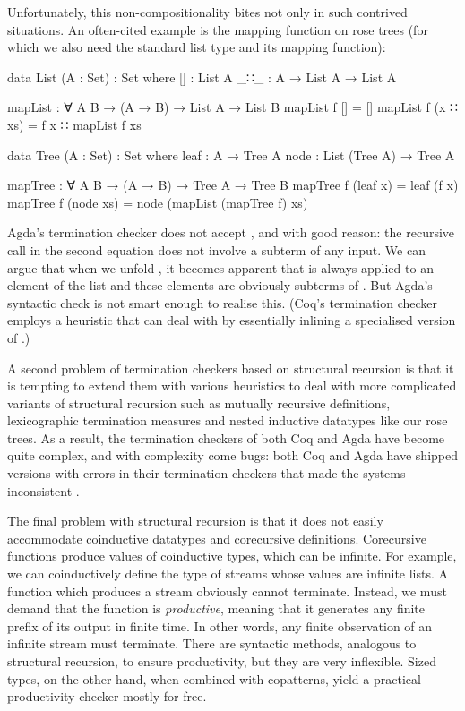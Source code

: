 Unfortunately, this non-compositionality bites not only in such contrived
situations. An often-cited example is the mapping function on rose trees (for
which we also need the standard list type and its mapping function):
\begin{code}
  data List (A : Set) : Set where
    []  : List A
    _∷_ : A → List A → List A

  mapList : ∀ {A B} → (A → B) → List A → List B
  mapList f []       = []
  mapList f (x ∷ xs) = f x ∷ mapList f xs

  data Tree (A : Set) : Set where
    leaf : A → Tree A
    node : List (Tree A) → Tree A

  mapTree : ∀ {A B} → (A → B) → Tree A → Tree B
  mapTree f (leaf x)  = leaf (f x)
  mapTree f (node xs) = node (mapList (mapTree f) xs)
\end{code}
Agda's termination checker does not accept , and with good
reason: the recursive call in the second equation does not involve a subterm of
any input. We can argue that when we unfold , it becomes apparent
that  is always applied to an element of the list  and
these elements are obviously subterms of . But Agda's syntactic check
is not smart enough to realise this. (Coq's termination checker employs a
heuristic that can deal with  by essentially inlining a
specialised version of .)

A second problem of termination checkers based on structural recursion is that
it is tempting to extend them with various heuristics to deal with more
complicated variants of structural recursion such as mutually recursive
definitions, lexicographic termination measures and nested inductive datatypes
like our rose trees. As a result, the termination checkers of both Coq and Agda
have become quite complex, and with complexity come bugs: both Coq and Agda have
shipped versions with errors in their termination checkers that made the systems
inconsistent \cite{coqbug2013,agdabug2013}.

The final problem with structural recursion is that it does not easily
accommodate coinductive datatypes and corecursive definitions. Corecursive
functions produce values of coinductive types, which can be infinite. For
example, we can coinductively define the type of streams whose values are
infinite lists. A function which produces a stream obviously cannot terminate.
Instead, we must demand that the function is \emph{productive}, meaning that it
generates any finite prefix of its output in finite time. In other words, any
finite observation of an infinite stream must terminate. There are syntactic
methods, analogous to structural recursion, to ensure productivity, but they are
very inflexible. Sized types, on the other hand, when combined with copatterns,
yield a practical productivity checker mostly for free.

